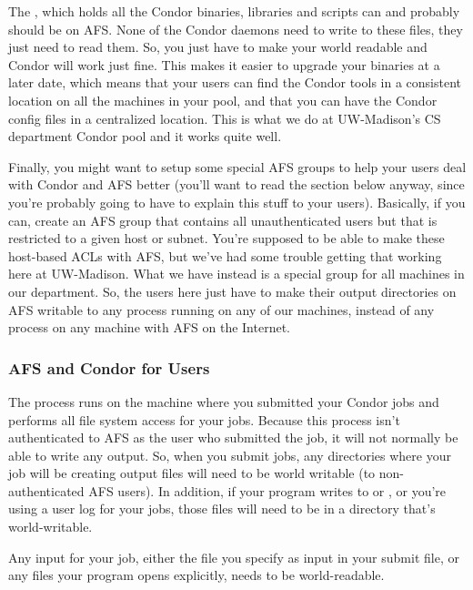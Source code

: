 The , which holds all the Condor binaries,
libraries and scripts can and probably should be on AFS.  None of the
Condor daemons need to write to these files, they just need to read
them.  So, you just have to make your  world
readable and Condor will work just fine.  This makes it easier to
upgrade your binaries at a later date, which means that your users can find
the Condor tools in a consistent location on all the machines in your
pool, and that you can have the Condor config files in a centralized
location.  This is what we do at UW-Madison's CS department Condor
pool and it works quite well.

Finally, you might want to setup some special AFS groups to help your
users deal with Condor and AFS better (you'll want to read the section
below anyway, since you're probably going to have to explain this
stuff to your users).  Basically, if you can, create an AFS group that
contains all unauthenticated users but that is restricted to a given
host or subnet.  You're supposed to be able to make these host-based
ACLs with AFS, but we've had some trouble getting that working here at
UW-Madison.  What we have instead is a special group for all machines
in our department.  So, the users here just have to make their output
directories on AFS writable to any process running on any of our
machines, instead of any process on any machine with AFS on the
Internet.

\subsubsection{\label{sec:Condor-AFS-Users}AFS and Condor for Users}

The  process runs on the machine where you submitted
your Condor jobs and performs all file system access for your jobs.
Because this process isn't authenticated to AFS as the user who
submitted the job, it will not normally be able to write any output.
So, when you submit jobs, any directories where your job will be
creating output files will need to be world writable (to
non-authenticated AFS users).  In addition, if your program writes to
 or , or you're using a user log for your
jobs, those files will need to be in a directory that's
world-writable.

Any input for your job, either the file you specify as input in your
submit file, or any files your program opens explicitly, needs to be
world-readable.

